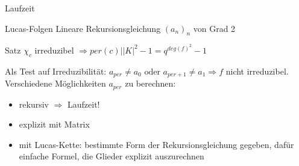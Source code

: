 \documentclass[german,10pt,xcolor=colortbl,compress]{beamer}%
\begin{document}
	\begin{frame}{Laufzeit}
		
	\end{frame}


	\begin{frame}{Lucas-Folgen}
		Lineare Rekursionsgleichung $(a_n)_n$ von Grad 2
		\begin{block}{Satz}
			$\chi_c$ irreduzibel $\Rightarrow per(c) \bigl| |K|^2-1 = q^{deg(f)^2}-1$
		\end{block}
		\medskip
		Als Test auf Irreduzibilität: $a_{per} \neq a_0 \text{ oder } a_{per+1} \neq a_1 \Rightarrow f$ nicht irreduzibel.\\
		\medskip
		Verschiedene Möglichkeiten $a_{per}$ zu berechnen:
		\begin{itemize}
			\item rekursiv $\Rightarrow$ Laufzeit!
			\item explizit mit Matrix
			\item mit Lucas-Kette: bestimmte Form der Rekursionsgleichung gegeben, dafür einfache Formel, die Glieder explizit auszurechnen
		\end{itemize}
	\end{frame}
	
\end{document}
